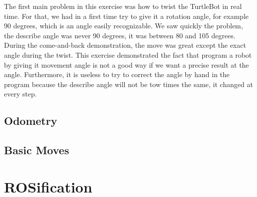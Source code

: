 \documentclass[aps,letterpaper,11pt]{revtex4}
\begin{document}
The first main problem in this exercise was how to twist the TurtleBot in real time. For that, we had in a first time try to give it a rotation angle, for example 90 degrees, which is an angle easily recognizable. We saw quickly the problem, the describe angle was never 90 degrees, it was between 80 and 105 degrees. During the come-and-back demonstration, the move was great except the exact angle during the twist. This exercise demonstrated the fact that program a robot by giving it movement angle is not a good way if we want a precise result at the angle. Furthermore, it is useless to try to correct the angle by hand in the program because the describe angle will not be tow times the same, it changed at every step.

\subsection{Odometry}

\subsection{Basic Moves}

\section{ROSification}

\subsection{}

\subsection{}
\end{document}
